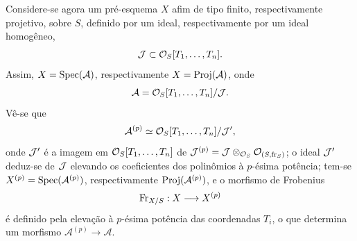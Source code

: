 Considere-se agora um pré-esquema $X$ afim de tipo finito, respectivamente projetivo, sobre $S$, definido por um ideal, respectivamente por um ideal homogêneo,
\[
\mathcal J\subset \mathcal{O}_S[T_1,\ldots,T_n].
\]
Assim, $X=\operatorname{Spec}(\mathcal{A})$, respectivamente $X=\operatorname{Proj}(\mathcal{A})$, onde
\[
\mathcal{A}=\mathcal{O}_S[T_1,\ldots,T_n]/\mathcal J.
\]
Vê-se que
\[
\mathcal{A}^{(p)}\simeq \mathcal{O}_S[T_1,\ldots,T_n]/\mathcal J',
\]
onde $\mathcal J'$ é a imagem em $\mathcal{O}_S[T_1,\ldots,T_n]$ de $\mathcal J^{(p)}=\mathcal J\otimes_{\mathcal{O}_S}\mathcal{O}_{(S,\operatorname{fr}_S)}$; o ideal $\mathcal J'$ deduz-se de $\mathcal J$ elevando os coeficientes dos polinômios à $p$-ésima potência; tem-se $X^{(p)}=\operatorname{Spec}(\mathcal{A}^{(p)})$, respectivamente $\operatorname{Proj}(\mathcal{A}^{(p)})$, e o morfismo de Frobenius
\[
\operatorname{Fr}_{X/S}:X\longrightarrow X^{(p)}
\]
é definido pela elevação à $p$-ésima potência das coordenadas $T_i$, o que determina um morfismo $\mathcal{A}^{(p)}\to\mathcal{A}$.
